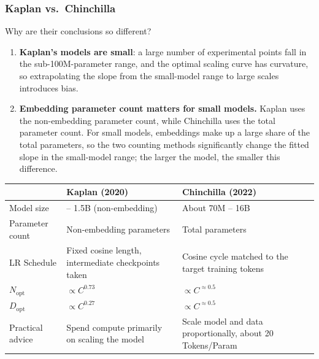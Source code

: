 \documentclass[
  english,
  11pt,
  a4paper,
]{article}
\newcounter{none} %
\providecommand{\tightlist}{%
  \setlength{\itemsep}{0pt}\setlength{\parskip}{0pt}}
\begin{document}
\subsubsection{Kaplan vs.~Chinchilla}\label{kaplan-vs.-chinchilla}

Why are their conclusions so different?

\begin{enumerate}
\def\labelenumi{\arabic{enumi}.}
\tightlist
\item
  \textbf{Kaplan's models are small}: a large number of experimental
  points fall in the sub-100M-parameter range, and the optimal scaling
  curve has curvature, so extrapolating the slope from the small-model
  range to large scales introduces bias.
\item
  \textbf{Embedding parameter count matters for small models.} Kaplan
  uses the non-embedding parameter count, while Chinchilla uses the
  total parameter count. For small models, embeddings make up a large
  share of the total parameters, so the two counting methods
  significantly change the fitted slope in the small-model range; the
  larger the model, the smaller this difference.
\end{enumerate}

{\def\LTcaptype{none} %
\begin{longtable}[]{@{}
  >{\centering\arraybackslash}p{}
  >{\centering\arraybackslash}p{}
  >{\centering\arraybackslash}p{}@{}}
\toprule\noalign{}
\begin{minipage}[b]{\linewidth}\centering
\end{minipage} & \begin{minipage}[b]{\linewidth}\centering
\textbf{Kaplan (2020)}
\end{minipage} & \begin{minipage}[b]{\linewidth}\centering
\textbf{Chinchilla (2022)}
\end{minipage} \\
\midrule\noalign{}
\endhead
\bottomrule\noalign{}
\endlastfoot
Model size & 768 -- 1.5B (non-embedding) & About 70M -- 16B \\
Parameter count & Non-embedding parameters & Total parameters \\
LR Schedule & Fixed cosine length, intermediate checkpoints taken &
Cosine cycle matched to the target training tokens \\
\(N_{\mathrm{opt}}\) & \(\propto C^{0.73}\) &
\(\propto C^{\approx0.5}\) \\
\(D_{\mathrm{opt}}\) & \(\propto C^{0.27}\) &
\(\propto C^{\approx0.5}\) \\
Practical advice & Spend compute primarily on scaling the model & Scale
model and data proportionally, about 20 Tokens/Param \\
\end{longtable}
}
\end{document}
